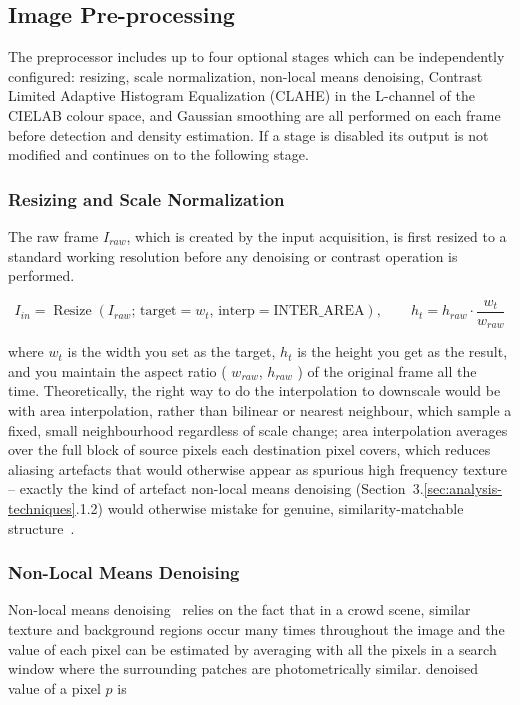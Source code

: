 \subsection{Image Pre-processing}

The preprocessor includes up to four optional stages which can be independently configured: resizing, scale normalization, non-local means denoising, Contrast Limited Adaptive Histogram Equalization (CLAHE) in the L-channel of the CIELAB colour space, and Gaussian smoothing are all performed on each frame before detection and density estimation. If a stage is disabled its output is not modified and continues on to the following stage.

\subsubsection{Resizing and Scale Normalization}

The raw frame $I_{raw}$, which is created by the input acquisition, is first resized to a standard working resolution before any denoising or contrast operation is performed.

\begin{equation}
	I_{in} = \operatorname{Resize}\left(I_{raw};\, \text{target}=w_{t},\, \text{interp}=\text{INTER\_AREA}\right), \qquad h_{t} = h_{raw} \cdot \frac{w_{t}}{w_{raw}}
	\label{eq:resize}
\end{equation}

where $w_t$ is the width you set as the target, $h_t$ is the height you get as the result, and you maintain the aspect ratio ( $w_{raw}$, $h_{raw}$ ) of the original frame all the time. Theoretically, the right way to do the interpolation to downscale would be with area interpolation, rather than bilinear or nearest neighbour, which sample a fixed, small neighbourhood regardless of scale change; area interpolation averages over the full block of source pixels each destination pixel covers, which reduces aliasing artefacts that would otherwise appear as spurious high frequency texture -- exactly the kind of artefact non-local means denoising (Section~3.\ref{sec:analysis-techniques}.1.2) would otherwise mistake for genuine, similarity-matchable structure~\cite{gonzalez2018digital}.

\subsubsection{Non-Local Means Denoising}

Non-local means denoising~\cite{buades2005nonlocal} relies on the fact that in a crowd scene, similar texture and background regions occur many times throughout the image and the value of each pixel can be estimated by averaging with all the pixels in a search window where the surrounding patches are photometrically similar. denoised value of a pixel $p$ is


